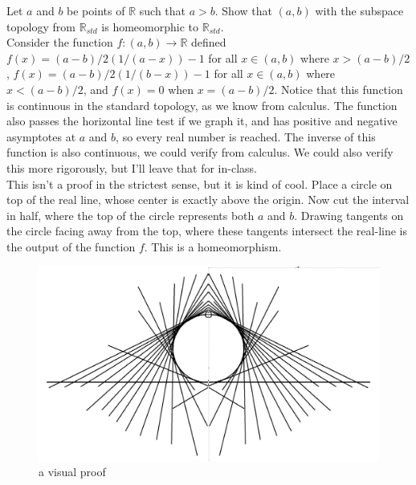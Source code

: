 \documentclass{article}
\newcommand{\R}{\mathbb{R}}
\newcommand{\R}{\mathbb{R}}
\begin{document}
 Let $a$ and $b$ be points of $\R$ such that $a > b$. Show that $(a,b)$ with the subspace topology from $\R_{std}$ is homeomorphic to $\R_{std}$.\\

 Consider the function $f:(a,b)\rightarrow \R$ defined $f(x) = (a-b)/2(1/(a-x))-1$ for all $x\in (a,b)$ where $x > (a-b)/2$, $f(x) = (a-b)/2(1/(b-x)) - 1$ for all $x\in (a,b)$ where $x < (a-b)/2$, and $f(x) = 0$ when $x = (a-b)/2$. Notice that this function is continuous in the standard topology, as we know from calculus. The function also passes the horizontal line test if we graph it, and has positive and negative asymptotes at $a$ and $b$, so every real number is reached. The inverse of this function is also continuous, we could verify from calculus. We could also verify this more rigorously, but I'll leave that for in-class.\\

 This isn't a proof in the strictest sense, but it is kind of cool. Place a circle on top of the real line, whose center is exactly above the origin. Now cut the interval in half, where the top of the circle represents both $a$ and $b$. Drawing tangents on the circle facing away from the top, where these tangents intersect the real-line is the output of the function $f$. This is a homeomorphism.

\begin{figure}[htbp]
\centerline{\includegraphics[scale=0.5]{notebook/topology_circle.png}}
\caption{a visual proof}
\label{fig}
\end{figure}
\end{document}
